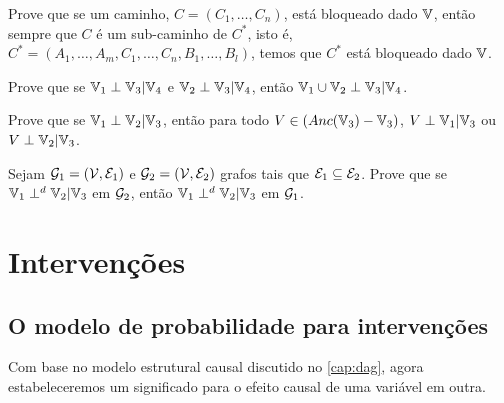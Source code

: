\begin{exercise}
 Prove que se um caminho,
 $C = (C_1, \ldots, C_n)$, está bloqueado
 dado ${\mathbb V}$, então sempre que $C$ é um sub-caminho de $C^*$,
 isto é, $C^* = (A_1, \ldots, A_m, C_1, \ldots, C_n, B_1, \ldots, B_l)$,
 temos que $C^*$ está bloqueado dado ${\mathbb V}$.
\end{exercise}

\begin{exercise}
 Prove que se ${\mathbb V}_1 \perp {\mathbb V}_3 | {\mathbb V}_4$ e
 ${\mathbb V}_2 \perp {\mathbb V}_3 | {\mathbb V}_4$, então
 ${\mathbb V}_1 \cup {\mathbb V}_2 \perp {\mathbb V}_3 | {\mathbb V}_4$.
\end{exercise}

\begin{exercise}
 Prove que se ${\mathbb V}_1 \perp {\mathbb V}_2 | {\mathbb V}_3$, então
 para todo $V \in (Anc({\mathbb V}_3)-{\mathbb V}_3)$, 
 $V \perp {\mathbb V}_1 | {\mathbb V}_3$ ou
 $V \perp {\mathbb V}_2 | {\mathbb V}_3$.
\end{exercise}

\begin{exercise}
 \label{lemma:dsep_monotone}
 Sejam ${\mathcal G}_1 = ({\mathcal V}, {\mathcal E}_1)$ e
 ${\mathcal G}_2 = ({\mathcal V}, {\mathcal E}_2)$ grafos
 tais que ${\mathcal E}_1 \subseteq {\mathcal E}_2$.
 Prove que se ${\mathbb V}_1 \perp^d {\mathbb V}_2 | {\mathbb V}_3$ em ${\mathcal G}_2$, então
 ${\mathbb V}_1 \perp^d {\mathbb V}_2 | {\mathbb V}_3$ em ${\mathcal G}_1$.
\end{exercise}

\chapter{Intervenções}
\label{cap:intervencao}


\section{O modelo de probabilidade para intervenções}
\label{sec:intervencao}

Com base no modelo estrutural causal discutido 
no \cref{cap:dag}, agora estabeleceremos
um significado para o efeito causal
de uma variável em outra.

